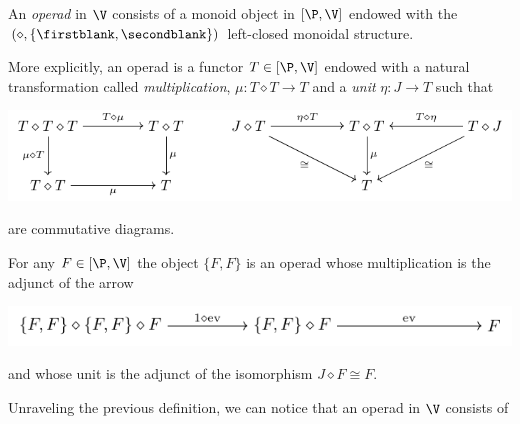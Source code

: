 \begin{definition}
An \emph{operad} in $\V$ consists of a monoid object in $[\P,\V]$ endowed with the $(\diamond,\{\firstblank,\secondblank\})$ left-closed monoidal structure.

More explicitly, an operad is a functor $T\in [\P,\V]$ endowed with a natural transformation called \emph{multiplication}, $\mu\colon T\diamond T\to T$ and a \emph{unit} $\eta\colon J\to T$ such that
\begin{center} 
 \includegraphics[scale=1]{figures/fig23} 
 \end{center}
are commutative diagrams. 
\end{definition}
%
\begin{definition}
For any $F\in [\P,\V]$ the object $\{F,F\}$ is an operad whose multiplication is the adjunct of the arrow
\begin{center} 
 \includegraphics[scale=1]{figures/fig24} 
 \end{center}
and whose unit is the adjunct of the isomorphism $J\diamond F\cong F$.
\end{definition}
Unraveling the previous definition, we can notice that an operad in $\V$ consists of

